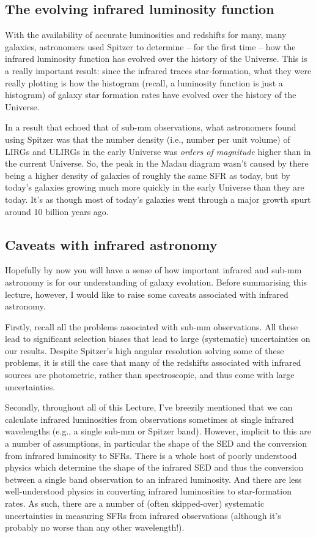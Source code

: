 \documentclass[11pt]{article}
\begin{document}
\subsection{The evolving infrared luminosity function}
With the availability of accurate luminosities and redshifts for many,
many galaxies, astronomers used Spitzer to determine -- for the first
time -- how the infrared luminosity function has evolved over the
history of the Universe. This is a really important result: since the
infrared traces star-formation, what they were really plotting is how
the histogram (recall, a luminosity function is just a histogram) of
galaxy star formation rates have evolved over the history of the
Universe.

In a result that echoed that of sub-mm observations, what astronomers
found using Spitzer was that the number density (i.e., number per unit
volume) of LIRGs and ULIRGs in the early Universe was {\it orders of
  magnitude} higher than in the current Universe. So, the peak in the
Madau diagram wasn't caused by there being a higher density of
galaxies of roughly the same SFR as today, but by today's galaxies
growing much more quickly in the early Universe than they are
today. It's as though most of today's galaxies went through a major
growth spurt around 10 billion years ago.

\subsection{Caveats with infrared astronomy}
Hopefully by now you will have a sense of how important infrared and
sub-mm astronomy is for our understanding of galaxy evolution. Before
summarising this lecture, however, I would like to raise some caveats
associated with infrared astronomy.

Firstly, recall all the problems associated with sub-mm
observations. All these lead to significant selection biases that
lead to large (systematic) uncertainties on our results. Despite
Spitzer's high angular resolution solving some of these problems, it
is still the case that many of the redshifts associated with infrared
sources are photometric, rather than spectroscopic, and thus come with
large uncertainties.

Secondly, throughout all of this Lecture, I've breezily mentioned that
we can calculate infrared luminosities from observations sometimes at
single infrared wavelengths (e.g., a single sub-mm or Spitzer
band). However, implicit to this are a number of assumptions, in
particular the shape of the SED and the conversion from infrared
luminosity to SFRs. There is a whole host of poorly understood physics
which determine the shape of the infrared SED and thus the conversion
between a single band observation to an infrared luminosity. And there
are less well-understood physics in converting infrared luminosities
to star-formation rates. As such, there are a number of (often
skipped-over) systematic uncertainties in measuring SFRs from infrared
observations (although it's probably no worse than any other wavelength!).
\end{document}
